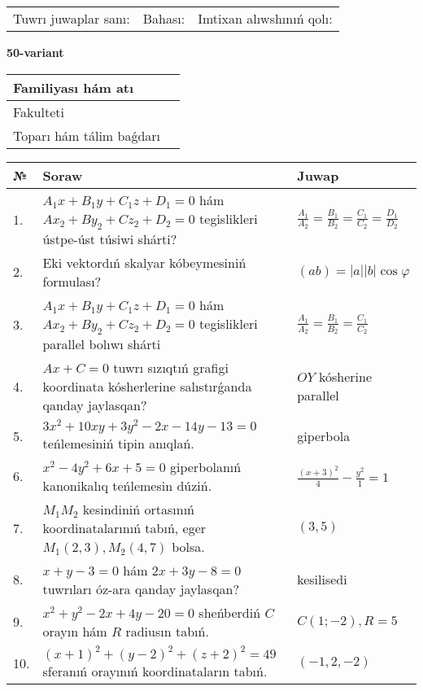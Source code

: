 \documentclass{article}
\begin{document}
\vspace{1cm}

\begin{tabular}{lll}
Tuwrı juwaplar sanı: \underline{\hspace{1.5cm}} & 
Bahası: \underline{\hspace{1.5cm}} & 
Imtixan alıwshınıń qolı: \underline{\hspace{2cm}} \\
\end{tabular}

\egroup

\newpage


\textbf{50-variant}\\

\bgroup
\def\arraystretch{1.6} %

\begin{tabular}{|m{5.7cm}|m{9.5cm}|}
\hline
Familiyası hám atı & \\
\hline
Fakulteti  & \\
\hline
Toparı hám tálim baǵdarı  & \\
\hline
\end{tabular}

\vspace{1cm}

\begin{tabular}{|m{0.7cm}|m{10cm}|m{4cm}|}
\hline
№ & Soraw & Juwap \\
\hline
1. & $A_1x+B_1y+C_1z+D_1=0$ hám $Ax_2+By_2+Cz_2+D_2=0$ tegislikleri ústpe-úst túsiwi shárti? & $\frac{A_1}{A_2}=\frac{B_1}{B_2}=\frac{C_1}{C_2}=\frac{D_1}{D_2}$ \\
\hline
2. & Eki vektordıń skalyar kóbeymesiniń formulası? & $(ab)=|a||b|\cos\varphi$ \\
\hline
3. & $A_1x+B_1y+C_1z+D_1=0$ hám $Ax_2+By_2+Cz_2+D_2=0$ tegislikleri parallel bolıwı shárti & $\frac{A_1}{A_2}=\frac{B_1}{B_2}=\frac{C_1}{C_2}$ \\
\hline
4. & $Ax+C=0$ tuwrı sızıqtıń grafigi koordinata kósherlerine salıstırǵanda qanday jaylasqan? & $OY$ kósherine parallel \\
\hline
5. & $3x^{2}+10xy+3y^{2}-2x-14y-13=0$ teńlemesiniń tipin anıqlań. & giperbola \\
\hline
6. & $x^{2}-4y^{2}+6x+5=0$ giperbolanıń kanonikalıq teńlemesin dúziń. & $\frac{(x+3)^{2}}{4}-\frac{y^{2}}{1}=1$ \\
\hline
7. & $M_{1}M_{2}$ kesindiniń ortasınıń koordinatalarınıń tabıń, eger $M_{1} (2, 3), M_{2} (4, 7)$ bolsa. & $(3,5)$ \\
\hline
8. & $x+y-3=0$ hám $2x+3y-8=0$ tuwrıları óz-ara qanday jaylasqan? & kesilisedi \\
\hline
9. & $x^{2}+y^{2}-2x+4y-20=0$ sheńberdiń $C$ orayın hám $R$ radiusın tabıń. & $C(1;-2), R=5$ \\
\hline
10. & $(x+1)^{2}+(y-2) ^{2}+(z+2) ^{2}=49$ sferanıń orayınıń koordinataların tabıń. & $(-1,2,-2)$ \\
\hline
\end{tabular}
\end{document}
